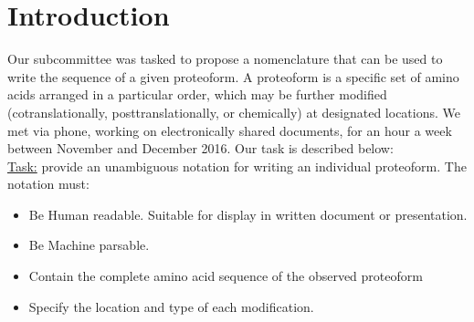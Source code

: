 
\newpage
\section{Introduction}

Our subcommittee was tasked to propose a nomenclature that can be used to write the sequence of a given proteoform. A proteoform is a specific set of amino acids arranged in a particular order, which may be further modified (cotranslationally, posttranslationally, or chemically) at designated locations. We met via phone, working on electronically shared documents, for an hour a week between November and December 2016. Our task is described below:
\\

\noindent\underline{Task:} provide an unambiguous notation for writing an individual proteoform. The notation must:
\begin{itemize}
\item Be Human readable. Suitable for display in written document or presentation.
\item Be Machine parsable. 
\item Contain the complete amino acid sequence of the observed proteoform
\item Specify the location and type of each modification.
\end{itemize}